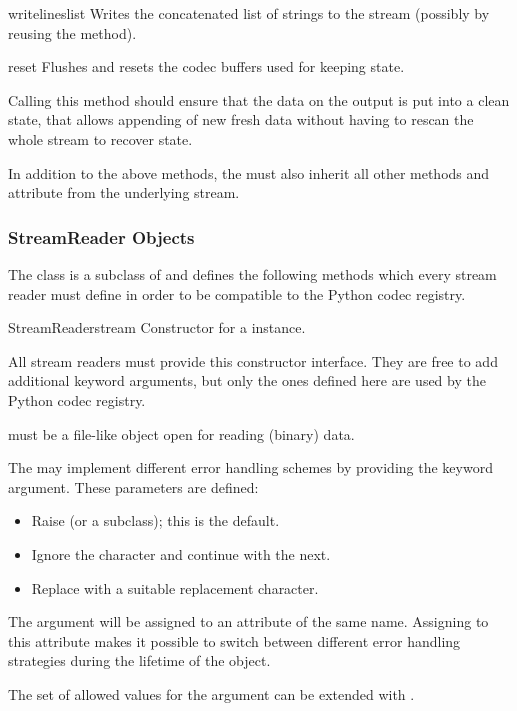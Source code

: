 \begin{methoddesc}{writelines}{list}
  Writes the concatenated list of strings to the stream (possibly by
  reusing the  method).
\end{methoddesc}

\begin{methoddesc}{reset}{}
  Flushes and resets the codec buffers used for keeping state.

  Calling this method should ensure that the data on the output is put
  into a clean state, that allows appending of new fresh data without
  having to rescan the whole stream to recover state.
\end{methoddesc}

In addition to the above methods, the  must also
inherit all other methods and attribute from the underlying stream.


\subsubsection{StreamReader Objects \label{stream-reader-objects}}

The  class is a subclass of  and
defines the following methods which every stream reader must define in
order to be compatible to the Python codec registry.

\begin{classdesc}{StreamReader}{stream}
  Constructor for a  instance. 

  All stream readers must provide this constructor interface. They are
  free to add additional keyword arguments, but only the ones defined
  here are used by the Python codec registry.

   must be a file-like object open for reading (binary)
  data.

  The  may implement different error handling
  schemes by providing the  keyword argument. These
  parameters are defined:

  \begin{itemize}
    \item {} Raise  (or a subclass);
                          this is the default.
    \item {} Ignore the character and continue with the next.
    \item {} Replace with a suitable replacement character.
  \end{itemize}

  The  argument will be assigned to an attribute of the
  same name. Assigning to this attribute makes it possible to switch
  between different error handling strategies during the lifetime
  of the  object.

  The set of allowed values for the  argument can
  be extended with .
\end{classdesc}

